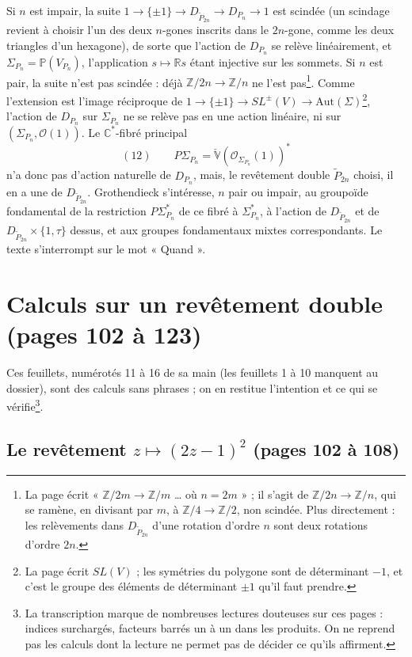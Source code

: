 \documentclass[11pt,a4paper]{article}
\begin{document}
Si $n$ est impair, la suite $1 \to \{\pm 1\} \to D_{\tilde P_{2n}} \to D_{P_n} \to 1$
est scindée (un scindage revient à choisir l'un des deux $n$-gones inscrits
dans le $2n$-gone, comme les deux triangles d'un hexagone), de sorte que
l'action de $D_{P_n}$ se relève linéairement, et
$\Sigma_{P_n} = \mathbb{P}(V_{P_n})$, l'application $s \mapsto \mathbb{R}s$ étant
injective sur les sommets. Si $n$ est pair, la suite n'est pas scindée : déjà
$\mathbb{Z}/2n \to \mathbb{Z}/n$ ne l'est pas\footnote{La page écrit
« $\mathbb{Z}/2m \to \mathbb{Z}/m$ … où $n = 2m$ » ; il s'agit de
$\mathbb{Z}/2n \to \mathbb{Z}/n$, qui se ramène, en divisant par $m$, à
$\mathbb{Z}/4 \to \mathbb{Z}/2$, non scindée. Plus directement : les relèvements
dans $D_{\tilde P_{2n}}$ d'une rotation d'ordre $n$ sont deux rotations d'ordre
$2n$.}. Comme l'extension est l'image réciproque de
$1 \to \{\pm 1\} \to SL^{\pm}(V) \to \mathrm{Aut}(\Sigma)$\footnote{La page écrit
$SL(V)$ ; les symétries du polygone sont de déterminant $-1$, et c'est le
groupe des éléments de déterminant $\pm 1$ qu'il faut prendre.}, l'action de
$D_{P_n}$ sur $\Sigma_{P_n}$ ne se relève pas en une action linéaire, ni sur
$(\Sigma_{P_n}, \mathcal{O}(1))$. Le $\mathbb{C}^*$-fibré principal
\[
(12)\qquad P\Sigma_{P_n} = \check{\mathbb{V}}(\mathcal{O}_{\Sigma_{P_n}}(1))^*
\]
n'a donc pas d'action naturelle de $D_{P_n}$, mais, le revêtement double
$\tilde P_{2n}$ choisi, il en a une de $D_{\tilde P_{2n}}$. Grothendieck
s'intéresse, $n$ pair ou impair, au groupoïde fondamental de la restriction
$P\Sigma^*_{P_n}$ de ce fibré à $\Sigma^*_{P_n}$, à l'action de
$D_{\tilde P_{2n}}$ et de $D_{\tilde P_{2n}} \times \{1, \tau\}$ dessus, et
aux groupes fondamentaux mixtes correspondants. Le texte s'interrompt sur le
mot « Quand ».

\section*{Calculs sur un revêtement double (pages 102 à 123)}

Ces feuillets, numérotés 11 à 16 de sa main (les feuillets 1 à 10 manquent au
dossier), sont des calculs sans phrases ; on en restitue l'intention et ce qui
se vérifie\footnote{La transcription marque de nombreuses lectures douteuses
sur ces pages : indices surchargés, facteurs barrés un à un dans les
produits. On ne reprend pas les calculs dont la lecture ne permet pas de
décider ce qu'ils affirment.}.

\subsection*{Le revêtement $z \mapsto (2z-1)^2$ (pages 102 à 108)}
\end{document}
